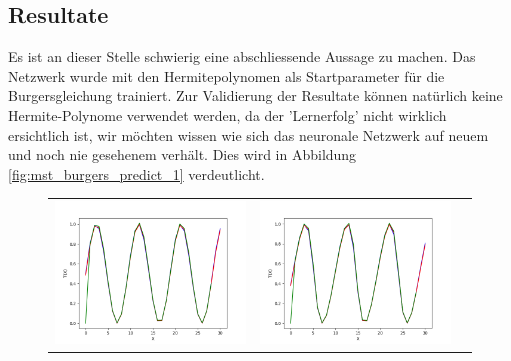 \subsection{Resultate}

Es ist an dieser Stelle schwierig eine abschliessende Aussage zu machen. Das Netzwerk wurde mit den Hermitepolynomen als Startparameter für die Burgersgleichung trainiert. Zur Validierung der Resultate können natürlich keine Hermite-Polynome verwendet werden, da der 'Lernerfolg' nicht wirklich ersichtlich ist, wir möchten wissen wie sich das neuronale Netzwerk auf neuem und noch nie gesehenem verhält. Dies wird in Abbildung \ref{fig:mst_burgers_predict_1} verdeutlicht.

\begin{figure}
	\centering
	\begin{tabular}{ccc}
		\includegraphics[scale=0.27]{learning/img/burger_predict0.png} &
		\includegraphics[scale=0.27]{learning/img/burger_predict10.png} &

\end{tabular}
\end{figure}

